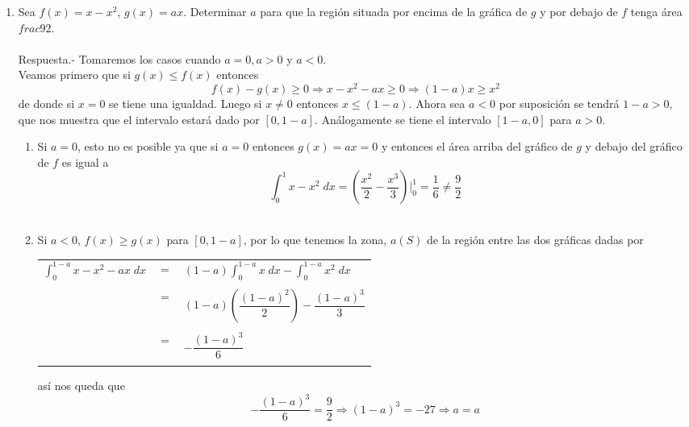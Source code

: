 \begin{enumerate}[\bfseries 1.]
\item Sea $f(x)=x-x^2$, $g(x) = ax$. Determinar $a$ para que la región situada por encima de la gráfica de $g$ y por debajo de $f$ tenga área $frac{9}{2}$.\\\\
    Respuesta.-\; Tomaremos los casos cuando $a=0, a>0$ y $a<0$. \\
    Veamos primero que si $g(x)\leq f(x)$ entonces $$f(x)-g(x)\geq 0 \Longrightarrow x-x^2-ax\geq 0 \Longrightarrow (1-a)x \geq x^2$$
    de donde si $x=0$ se tiene una igualdad. Luego si $x\neq 0$ entonces $x\leq (1-a)$. Ahora sea $a<0$ por suposición se tendrá $1-a>0$, que nos muestra que el intervalo estará dado por $[0,1-a]$. Análogamente se tiene el intervalo $[1-a,0]$ para $a>0$.\\
    \begin{enumerate}[\bfseries C 1.]
	\item Si $a=0$, esto no es posible ya que si $a = 0$ entonces $g(x) = ax = 0$ y entonces el área arriba del gráfico de $g$ y debajo del gráfico de $f$ es igual a
	    $$\int_0^1 x-x^2\; dx = \left(\dfrac{x^2}{2} - \dfrac{x^3}{3}\right)\bigg|_0^1 = \dfrac{1}{6} \neq \dfrac{9}{2}$$\\
	
	\item Si $a<0$, $f(x)\geq g(x)$ para $[0,1-a]$, por lo que tenemos la zona, $a(S)$ de la región entre las dos gráficas dadas por 
	    \begin{center}
		\begin{tabular}{rcl}
		    $\displaystyle\int_0^{1-a} x-x^2 - ax \; dx$&$=$&$\displaystyle(1-a)\int_0^{1-a} x\; dx - \int_0^{1-a} x^2 \; dx$\\\\
		    &$=$&$(1-a)\left(\dfrac{(1-a)^2}{2}\right) - \dfrac{(1-a)^3}{3}$\\\\
		    &$=$&$-\dfrac{(1-a)^3}{6}$\\\\
		\end{tabular}
	    \end{center}
	    así nos queda que $$-\dfrac{(1-a)^3}{6} = \dfrac{9}{2} \Longrightarrow (1-a)^3 = -27 \Longrightarrow a = a$$\\


\end{enumerate}
\end{enumerate}

